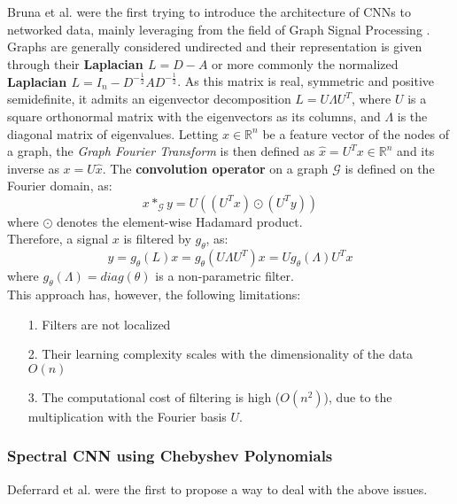  Bruna et al. \cite{bruna2013spectral} were the first
trying to introduce the architecture of CNNs to networked data,
mainly leveraging from the field of Graph Signal Processing \cite{shuman2012emerging}.
Graphs are generally considered undirected and their representation is given
through their \textbf{Laplacian $L = D -A$} or more commonly the normalized
\textbf{Laplacian $L = I_n - D^{-\frac{1}{2}}AD^{-\frac{1}{2}}$}. As this matrix
is real, symmetric and positive semidefinite, it admits an eigenvector
decomposition $L=U\Lambda U^T$, where $U$ is a square orthonormal matrix with
the eigenvectors as its columns, and $\Lambda$ is the diagonal matrix of eigenvalues.
Letting $x\in \mathbb{R}^{n}$ be a feature vector of the nodes of a graph,
the {\em Graph Fourier Transform} is then defined as $\hat{x}=U^T x \in \mathbb{R}^n$
and its inverse as $x = U\hat{x}$. The \textbf{convolution operator} on a graph
$\mathcal{G}$ is defined on the Fourier domain, as:
\begin{equation*}
x *_{\mathcal{G}} y = U((U^T x)\odot (U^T y))
\end{equation*}
where $\odot$ denotes the element-wise Hadamard product.\\
Therefore, a signal $x$ is filtered by $g_{\theta}$, as:\\
\begin{equation}
y = g_{\theta}(L)x = g_{\theta} (U\Lambda U^T)x = U g_{\theta}(\Lambda ) U^T x
\end{equation}
where $g_{\theta}(\Lambda) = diag(\theta)$ is a non-parametric filter.\\
This approach has, however, the following limitations:
\begin{itemize}
\item [1.] Filters are not localized
\item [2.] Their learning complexity scales with the dimensionality of the data $O(n)$
\item [3.] The computational cost of filtering is high ($O(n^2)$), due to the
multiplication with the Fourier basis $U$.
\end{itemize}

\subsubsection*{Spectral CNN using Chebyshev Polynomials}
Deferrard et al. \cite{defferrard2016convolutional} were the first to propose a way to deal with
the above issues.\\

